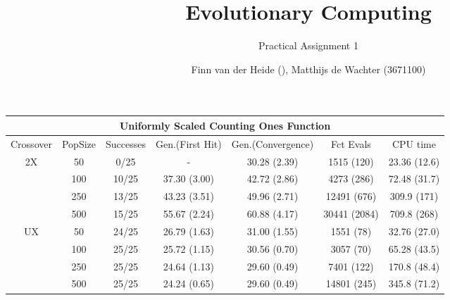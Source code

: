 \documentclass[]{scrartcl}
\title{Evolutionary Computing}
\subtitle{Practical Assignment 1}
\author{Finn van der Heide (), Matthijs de Wachter (3671100)}
\begin{document}
\maketitle

\begin{table}
	\tabcolsep=0.09cm
	\begin{tabular}{|c|c|c|c|c|c|c|}
		\hline
		\multicolumn{7}{|c|}{Uniformly Scaled Counting Ones Function}                                                   \\ \hline
		Crossover           & PopSize & Successes & Gen.(First Hit) & Gen.(Convergence) & Fct Evals    & CPU time     \\ \hline
		\multirow{4}{*}{2X} & 50      & 0/25      & -                & 30.28 (2.39)       & 1515 (120)   & 23.36 (12.6) \\ \cline{2-7} 
		& 100     & 10/25     & 37.30 (3.00)     & 42.72 (2.86)       & 4273 (286)   & 72.48 (31.7) \\ \cline{2-7} 
		& 250     & 13/25     & 43.23 (3.51)     & 49.96 (2.71)       & 12491 (676)  & 309.9 (171)  \\ \cline{2-7} 
		& 500     & 15/25     & 55.67 (2.24)     & 60.88 (4.17)       & 30441 (2084) & 709.8 (268)  \\ \hline \hline
		\multirow{4}{*}{UX} & 50      & 24/25     & 26.79 (1.63)     & 31.00 (1.55)       & 1551 (78)    & 32.76 (27.0) \\ \cline{2-7} 
		& 100     & 25/25     & 25.72 (1.15)     & 30.56 (0.70)       & 3057 (70)    & 65.28 (43.5) \\ \cline{2-7} 
		& 250     & 25/25     & 24.64 (1.13)     & 29.60 (0.49)       & 7401 (122)   & 170.8 (48.4) \\ \cline{2-7} 
		& 500     & 25/25     & 24.24 (0.65)     & 29.60 (0.49)       & 14801 (245)  & 345.8 (71.2) \\ \hline
	\end{tabular}
\end{table}
\end{document}
